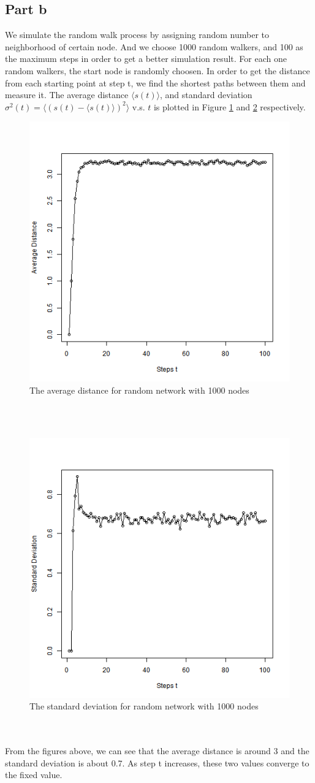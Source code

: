 \documentclass{article}
\begin{document}
\subsection{Part b}
We simulate the random walk process by assigning random number to neighborhood of certain node. And we choose 1000 random walkers, and 100 as the maximum steps in order to get a better simulation result. For each one random walkers, the start node is randomly choosen. In order to get the distance from each starting point at step t, we find the shortest paths between them and measure it. The average distance $\langle s(t)\rangle$, and standard deviation $\sigma^2(t)=\langle (s(t)-\langle s(t)\rangle)^2\rangle$ v.s. $t$ is plotted in Figure \ref{fig:p1_b1} and \ref{fig:p1_b2} respectively.
\begin{figure}[htbp]
\centering
\includegraphics[width=.6\textwidth]{Q1b_1.png}
\caption{The average distance for random network with 1000 nodes}
\label{fig:p1_b1}
\end{figure}\\
\\
\begin{figure}[htbp]
\centering
\includegraphics[width=.6\textwidth]{Q1b_2.png}
\caption{The standard deviation for random network with 1000 nodes}
\label{fig:p1_b2}
\end{figure}\\
\\
From the figures above, we can see that the average distance is around 3 and the standard deviation is about 0.7. As step t increases, these two values converge to the fixed value.
\end{document}

